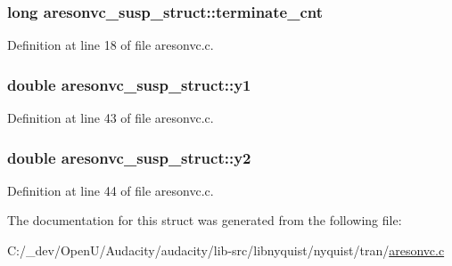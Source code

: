 \subsubsection[{\texorpdfstring{terminate\+\_\+cnt}{terminate_cnt}}]{\setlength{\rightskip}{0pt plus 5cm}long aresonvc\+\_\+susp\+\_\+struct\+::terminate\+\_\+cnt}\hypertarget{structaresonvc__susp__struct_a6deb3ff59f3fdacbc719376f91c01528}{}\label{structaresonvc__susp__struct_a6deb3ff59f3fdacbc719376f91c01528}


Definition at line 18 of file aresonvc.\+c.

\subsubsection[{\texorpdfstring{y1}{y1}}]{\setlength{\rightskip}{0pt plus 5cm}double aresonvc\+\_\+susp\+\_\+struct\+::y1}\hypertarget{structaresonvc__susp__struct_adc0d5a6181769d16ea9df947ea427522}{}\label{structaresonvc__susp__struct_adc0d5a6181769d16ea9df947ea427522}


Definition at line 43 of file aresonvc.\+c.

\subsubsection[{\texorpdfstring{y2}{y2}}]{\setlength{\rightskip}{0pt plus 5cm}double aresonvc\+\_\+susp\+\_\+struct\+::y2}\hypertarget{structaresonvc__susp__struct_a06de2c53180f638b821df583fda762eb}{}\label{structaresonvc__susp__struct_a06de2c53180f638b821df583fda762eb}


Definition at line 44 of file aresonvc.\+c.



The documentation for this struct was generated from the following file\+:\begin{DoxyCompactItemize}
\item 
C\+:/\+\_\+dev/\+Open\+U/\+Audacity/audacity/lib-\/src/libnyquist/nyquist/tran/\hyperlink{aresonvc_8c}{aresonvc.\+c}\end{DoxyCompactItemize}
